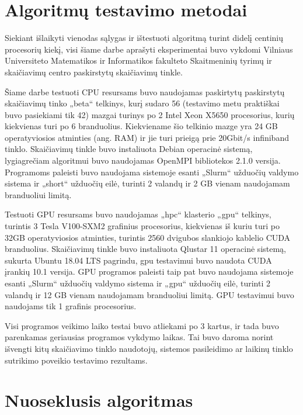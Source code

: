 \documentclass{VUMIFPSbakalaurinis}
\begin{document}
\section{Algoritmų testavimo metodai}


Siekiant išlaikyti vienodas sąlygas ir ištestuoti algoritmą turint didelį centinių procesorių kiekį, visi šiame darbe aprašyti eksperimentai buvo vykdomi Vilniaus Universiteto Matematikos ir Informatikos fakulteto Skaitmeninių tyrimų ir skaičiavimų centro paskirstytų skaičiavimų tinkle.

Šiame darbe testuoti CPU resursams buvo naudojamas paskirtytų paskirstytų skaičiavimų tinko „beta“ telkinys, kurį sudaro 56 (testavimo metu praktiškai buvo pasiekiami tik 42) mazgai turinys po 2 Intel Xeon X5650 procesorius, kurių kiekvienas turi po 6 branduolius. 
Kiekviename šio telkinio mazge yra 24 GB operatyviosios atminties (ang. RAM) ir jie turi prieigą prie 20Gbit/s infiniband tinklo.
Skaičiavimų tinkle buvo instaliuota Debian operacinė sistemą, lygiagrečiam algoritmui buvo naudojamas OpenMPI bibliotekos 2.1.0 versija.
Programoms paleisti buvo naudojama sistemoje esanti „Slurm“ užduočių valdymo sistema ir „short“ užduočių eilė, turinti 2 valandų ir 2 GB vienam naudojamam branduoliui limitą.

Testuoti GPU resursams buvo naudojamas „hpc“ klasterio „gpu“ telkinys, turintis 3 Tesla V100-SXM2 grafinius procesorius, kiekvienas iš kuriu turi po 32GB operatyviosios atminties, turintis 2560 dvigubos slankiojo kablelio CUDA branduolius.
Skaičiavimų tinkle buvo instaliuota Qlustar 11  operacinė sistemą, sukurta Ubuntu 18.04 LTS pagrindu, gpu testavimui buvo naudota CUDA įrankių 10.1 versija. 
GPU programos paleisti taip pat buvo naudojama sistemoje esanti „Slurm“ užduočių valdymo sistema ir „gpu“ užduočių eilė, turinti 2 valandų ir 12 GB vienam naudojamam branduoliui limitą.
GPU testavimui buvo naudojams tik 1 grafinis procesorius.

Visi programos veikimo laiko testai buvo atliekami po 3 kartus, ir tada buvo parenkamas geriausias programos vykdymo laikas. 
Tai buvo daroma norint išvengti kitų skaičiavimo tinklo naudotojų, sistemos pasileidimo ar laikinų tinklo sutrikimo poveikio testavimo rezultams.

\section{Nuoseklusis algoritmas}
\end{document}
